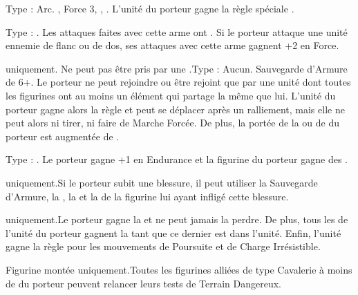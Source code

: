 Type : Arc. , Force 3, \lightningattacks{}, . L'unité du porteur gagne la règle spéciale \quicktofire{}.

Type : \hw{}. Les attaques faites avec cette arme ont . Si le porteur attaque une unité ennemie de flanc ou de dos, ses attaques avec cette arme gagnent +2 en Force.

\endpricelist

\armymagicalarmour

\startpricelist

\goblin{} uniquement. Ne peut pas être pris par une \largetarget{}.\newline Type : Aucun. Sauvegarde d'Armure de 6+. Le porteur ne peut rejoindre ou être rejoint que par une unité dont toutes les figurines ont au moins un élément qui partage la même \greenhiderace{} que lui. L'unité du porteur gagne alors la règle \vanguard{} et peut se déplacer après un ralliement, mais elle ne peut alors ni tirer, ni faire de Marche Forcée. De plus, la portée de la \inspiringpresence{} ou de \holdyourground{} du porteur est augmentée de .

Type : \ha{}. Le porteur gagne +1 en Endurance et la figurine du porteur gagne des .

\endpricelist

\armytalismans

\startpricelist

\goblin{} uniquement.\newline Si le porteur subit une blessure, il peut utiliser la Sauvegarde d'Armure, la \wardsave{}, la \regeneration{} et la \magicresistance{} de la figurine lui ayant infligé cette blessure.

\endpricelist

\armyenchanteditems

\startpricelist

\feralorc{} uniquement.\newline Le porteur gagne la \frenzy{} et ne peut jamais la perdre. De plus, tous les \feralorcs{} de l'unité du porteur gagnent la \frenzy{} tant que ce dernier est dans l'unité. Enfin, l'unité gagne la règle \swiftstride{} pour les mouvements de Poursuite et de Charge Irrésistible.

Figurine montée uniquement.\newline Toutes les figurines alliées de type Cavalerie à moins de  du porteur peuvent relancer leurs tests de Terrain Dangereux.

